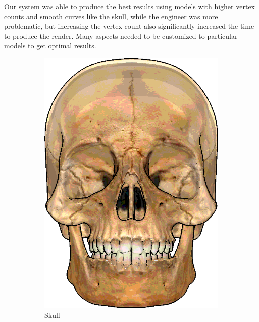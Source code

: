 
Our system was able to produce the best results using models with higher vertex counts and smooth curves like the skull, while the engineer was more problematic, but increasing the vertex count also significantly increased the time to produce the render. Many aspects needed to be customized to particular models to get optimal results.

\begin{figure}[h]
\centering
\begin{subfigure}[b]{0.2\textwidth}
        \includegraphics[width=\textwidth]{img/Textures/FinalSkull.png}
        \caption{Skull}
 		\label{fig:FinalSkull}
\end{subfigure}
~
\hspace{36pt}
~
\begin{subfigure}[b]{0.18\textwidth}

\end{subfigure}
\end{figure}
